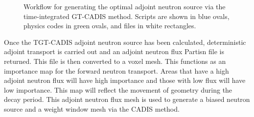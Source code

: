 \begin{figure}
\begin{tikzpicture}[node distance = 2 cm, auto]
        \end{tikzpicture}

	\caption [Workflow to generate TGT-CADIS adjoint neutron source]
	{Workflow for generating the optimal
	adjoint neutron source via the time-integrated GT-CADIS method.  Scripts are shown in
	blue ovals, physics codes in green ovals, and files in white
	rectangles.}
\end{figure}

Once the TGT-CADIS adjoint neutron source has been calculated, deterministic
adjoint transport is carried out and an adjoint neutron flux Partisn file is
returned.  This file is then converted to a voxel mesh.
This functions as an importance map for the forward neutron transport.  Areas
that have a high adjoint neutron flux will have high importance and those with
low flux will have low importance.  This map will reflect the movement of
geometry during the decay period.  This adjoint neutron flux mesh is used to
generate a biased neutron source and a weight window mesh via the CADIS method.


